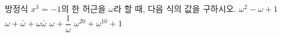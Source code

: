 방정식 $x^3=-1$의 한 허근을 $\omega$라 할 때, 다음 식의 값을 구하시오. 
 $\omega^2-\omega+1$
 $\omega+\bar{\omega}+\omega\bar{\omega}$
 $\omega+\dfrac{1}{\omega}$
 $\omega^{20}+\omega^{10}+1$
